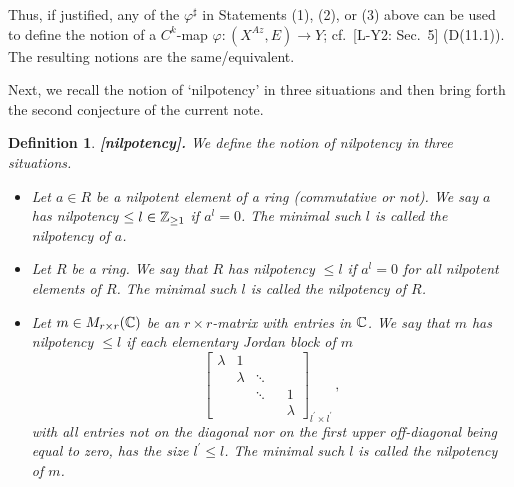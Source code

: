 \documentclass[11pt]{article}
\numberwithin{equation}{subsection}
\newtheorem{sdefinition}[stheorem]{Definition}
\begin{document}
\bigskip

Thus, if justified,
 any of the $\varphi^{\sharp}$ in Statements (1), (2), or (3) above
 can be used to define the notion of a $C^k$-map $\varphi:(X^{\!A\!z},E)\rightarrow Y$;
cf.\ [L-Y2: Sec.\ 5] (D(11.1)).
The resulting notions are the same/equivalent.

\bigskip

Next, we recall the notion of `nilpotency' in three situations  and  then
 bring forth the second conjecture of the current note.

\bigskip

\begin{sdefinition}{\bf [nilpotency].} \rm
   We define the notion of {\it nilpotency} in three situations.
   \begin{itemize}
     \item[(1)]
      Let $a\in R$  be a nilpotent element of a ring (commutative or not).
	  We say $a$ has nilpotency $\le l\in{\Bbb Z}_{\ge 1}$ if $a^l=0$.
	  The minimal such $l$ is called the {\it nilpotency} of $a$.

     \item[(2)]
      Let $R$ be a ring.
	  We say that $R$ has nilpotency $\le l$ if $a^l=0$ for all nilpotent elements of $R$.
	  The minimal such $l$ is called the {\it nilpotency} of $R$.
 	
	 \item[(3)]
      Let $m\in M_{r\times r}({\Bbb C})$ be an $r\times r$-matrix with entries in ${\Bbb C}$.
	  We say that $m$ has nilpotency $\le l$ if each elementary Jordan block of $m$ 	
	 {\scriptsize
	    $$
	     \left[
		   \begin{array}{ccccc}
		     \lambda  & 1 \\
			    & \lambda  & \ddots\\
		        & & \ddots & & 1 \\
			 &&&& \lambda
		   \end{array}
		 \right]_{l^{\prime}\times l^{\prime}}\,,	
	    $$}with
	  all entries not on the diagonal nor on the first upper off-diagonal being equal to zero,
	  has the size $l^{\prime}\le l$.	
	  The minimal such $l$ is called the {\it nilpotency} of $m$. 	
   \end{itemize}
\end{sdefinition}

\medskip
\end{document}
